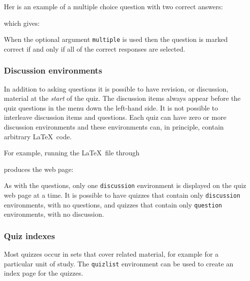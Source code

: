 \documentclass[svgnames]{article}
\begin{document}
Her is an example of a multiple choice question
with two correct answers:

  

\noindent which gives:


When the optional argument \Verb|multiple| is used then the question is
marked correct if and only if all of the correct responses are selected.

  \subsubsection{Discussion environments}

In addition to asking questions it is possible to have revision, or
discussion, material at the \textit{start} of the quiz.  The discussion
items always appear before the quiz questions in the menu down the
left-hand side. It is not possible to interleave discussion items and
questions. Each quiz can have zero or more discussion environments and
these environments can, in principle, contain arbitrary \LaTeX\ code.

For example, running the \LaTeX\ file through \MathQuiz

  

produces the web page:


As with the questions, only one \Verb|discussion| environment is
displayed on the quiz web page at a time. It is possible to have quizzes
that contain only \Verb|discussion| environments, with no questions, and
quizzes that contain only \Verb|question| environments, with no
discussion.

  \subsubsection{Quiz indexes}


  Most quizzes occur in sets that cover related material, for example
  for a particular unit of study. The \Verb|quizlist| environment can be
  used to create an index page for the quizzes.
\end{document}
